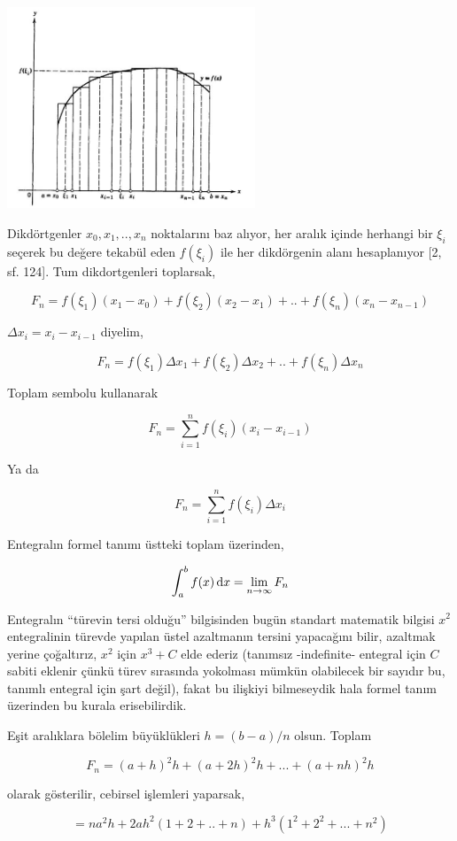 \documentclass[12pt,fleqn]{article}\usepackage{../../common}
\begin{document}
\includegraphics[width=20em]{ode_mattuck_65_diffint1_04.jpg}

Dikdörtgenler $x_0,x_1,..,x_n$ noktalarını baz alıyor, her aralık içinde
herhangi bir $\xi_i$ seçerek bu değere tekabül eden $f(\xi_i)$ ile her
dikdörgenin alanı hesaplanıyor [2, sf. 124]. Tum dikdortgenleri toplarsak,

$$
F_n = f(\xi_1)(x_1 - x_0) + f(\xi_2)(x_2 - x_1) + .. + f(\xi_n)(x_n - x_{n-1})
$$

$\Delta x_i = x_i - x_{i-1}$ diyelim, 

$$
F_n = f(\xi_1)\Delta x_1 + f(\xi_2)\Delta x_2 + .. + f(\xi_n)\Delta x_n
$$

Toplam sembolu kullanarak

$$
F_n = \sum _{i=1}^{n} f(\xi_i) (x_i - x_{i-1}) 
$$

Ya da

$$
F_n = \sum _{i=1}^{n} f(\xi_i) \Delta x_i
$$

Entegralın formel tanımı üstteki toplam üzerinden,

$$
\int _{a}^{b} f(x) \,\mathrm{d} x = \lim_{n \to \infty} F_n
$$

Entegralın ``türevin tersi olduğu'' bilgisinden bugün standart matematik bilgisi
$x^2$ entegralinin türevde yapılan üstel azaltmanın tersini yapacağını bilir,
azaltmak yerine çoğaltırız, $x^2$ için $x^3 + C$ elde ederiz (tanımsız
-indefinite- entegral için $C$ sabiti eklenir çünkü türev sırasında yokolması
mümkün olabilecek bir sayıdır bu, tanımlı entegral için şart değil), fakat
bu ilişkiyi bilmeseydik hala formel tanım üzerinden bu kurala erisebilirdik. 

Eşit aralıklara bölelim büyüklükleri $h = (b-a)/n$ olsun. Toplam

$$
F_n = (a+h)^2 h + (a+2h)^2 h + ... + (a+nh)^2 h
$$

olarak gösterilir, cebirsel işlemleri yaparsak,

$$
= na^2 h + 2ah^2 (1+2+..+n) + h^3 (1^2+2^2+...+n^2)
$$
\end{document}
